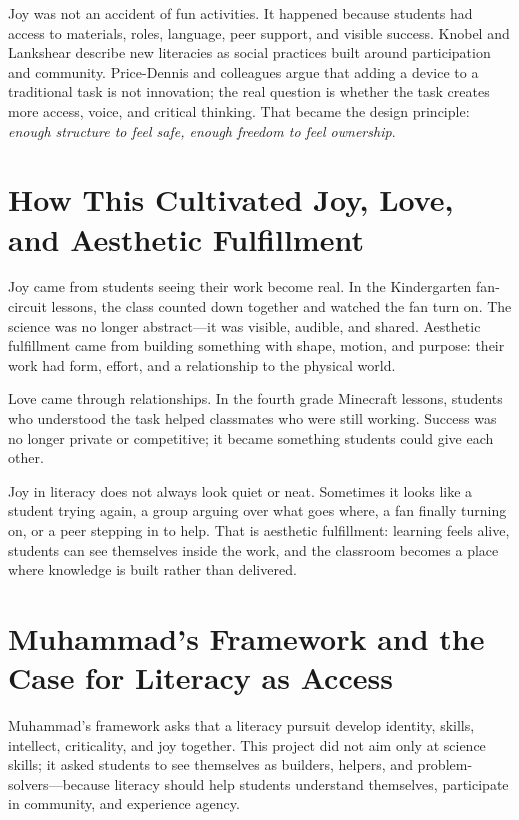 \documentclass[11pt]{article}
\begin{document}
Joy was not an accident of fun activities. It happened because students had access to materials, roles, language, peer support, and visible success. Knobel and Lankshear describe new literacies as social practices built around participation and community. Price-Dennis and colleagues argue that adding a device to a traditional task is not innovation; the real question is whether the task creates more access, voice, and critical thinking. That became the design principle: \textit{enough structure to feel safe, enough freedom to feel ownership}.

\section*{How This Cultivated Joy, Love, and Aesthetic Fulfillment}

Joy came from students seeing their work become real. In the Kindergarten fan-circuit lessons, the class counted down together and watched the fan turn on. The science was no longer abstract---it was visible, audible, and shared. Aesthetic fulfillment came from building something with shape, motion, and purpose: their work had form, effort, and a relationship to the physical world.

Love came through relationships. In the fourth grade Minecraft lessons, students who understood the task helped classmates who were still working. Success was no longer private or competitive; it became something students could give each other.

Joy in literacy does not always look quiet or neat. Sometimes it looks like a student trying again, a group arguing over what goes where, a fan finally turning on, or a peer stepping in to help. That is aesthetic fulfillment: learning feels alive, students can see themselves inside the work, and the classroom becomes a place where knowledge is built rather than delivered.

\section*{Muhammad's Framework and the Case for Literacy as Access}

Muhammad's framework asks that a literacy pursuit develop identity, skills, intellect, criticality, and joy together. This project did not aim only at science skills; it asked students to see themselves as builders, helpers, and problem-solvers---because literacy should help students understand themselves, participate in community, and experience agency.
\end{document}
